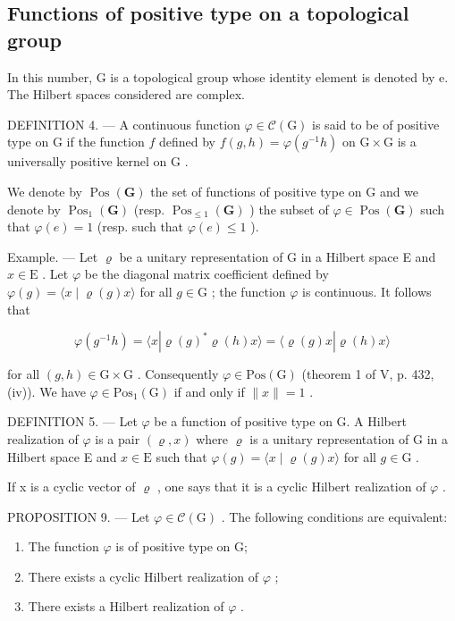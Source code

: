 \subsection{Functions of positive type on a topological group}

In this number, G is a topological group whose identity element is denoted by e. The Hilbert spaces considered are complex.

DEFINITION 4. --- A continuous function \(\varphi\in\mathcal{C}(\mathrm{G})\) is said to be of positive type on G if the function \(f\) defined by \(f(g,h)=\varphi(g^{-1}h)\) on \(\mathrm{G}\times\mathrm{G}\) is a universally positive kernel on \(\mathrm{G}\) .

We denote by \(\operatorname{Pos}(\mathbf{G})\) the set of functions of positive type on G and we denote by \(\operatorname{Pos}_{1}(\mathbf{G})\) (resp. \(\operatorname{Pos}_{\leqslant1}(\mathbf{G})\) ) the subset of \(\varphi\in\operatorname{Pos}(\mathbf{G})\) such that \(\varphi(e)=1\) (resp. such that \(\varphi(e)\leqslant1\) ).

Example. --- Let \(\varrho\) be a unitary representation of G in a Hilbert space E and \(x \in \mathrm{E}\) . Let \(\varphi\) be the diagonal matrix coefficient defined by \(\varphi(g) = \langle x \mid \varrho(g)x \rangle\) for all \(g \in \mathrm{G}\) ; the function \(\varphi\) is continuous. It follows that

\[
\varphi (g ^ {- 1} h) = \langle x | \varrho (g) ^ {*} \varrho (h) x \rangle = \langle \varrho (g) x | \varrho (h) x \rangle
\]

for all \((g,h)\in\mathrm{G}\times\mathrm{G}\) . Consequently \(\varphi\in\mathrm{Pos}(\mathrm{G})\) (theorem 1 of V, p. 432, (iv)). We have \(\varphi\in\mathrm{Pos}_{1}(\mathrm{G})\) if and only if \(\|x\|=1\) .

DEFINITION 5. --- Let \(\varphi\) be a function of positive type on G. A Hilbert realization of \(\varphi\) is a pair \((\varrho, x)\) where \(\varrho\) is a unitary representation of G in a Hilbert space E and \(x \in \mathrm{E}\) such that \(\varphi(g) = \langle x \mid \varrho(g)x \rangle\) for all \(g \in \mathrm{G}\) .

If x is a cyclic vector of \(\varrho\) , one says that it is a cyclic Hilbert realization of \(\varphi\) .

PROPOSITION 9. --- Let \(\varphi\in\mathcal{C}(\mathrm{G})\) . The following conditions are equivalent:

\begin{enumerate}
\def\labelenumi{(\roman{enumi})}
\item
  The function \(\varphi\) is of positive type on G;
\item
  There exists a cyclic Hilbert realization of \(\varphi\) ;
\item
  There exists a Hilbert realization of \(\varphi\) .
\end{enumerate}

